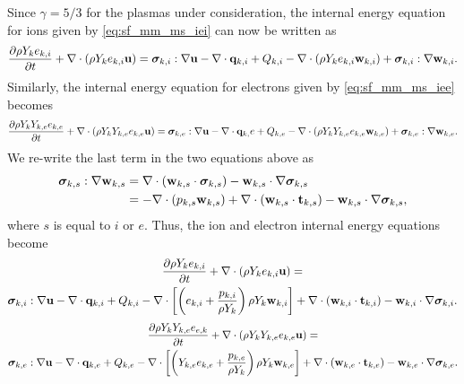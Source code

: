 \documentclass[a4paper,11pt]{report}
\begin{document}
Since $\gamma = 5/3$ for the plasmas under consideration, the internal energy equation for ions given by \cref{eq:sf_mm_ms_iei} can now be written as
\begin{equation*}
    \frac{\partial \rho Y_k e_{k,i}}{\partial t} + \nabla \cdot \left( \rho Y_k e_{k,i} \mathbf{u} \right) = \bm \sigma_{k,i} : \nabla \mathbf{u} - \nabla \cdot \mathbf{q}_{k,i} + Q_{k,i} - \nabla \cdot \left( \rho Y_k e_{k,i} \mathbf{w}_{k,i} \right) + \bm \sigma_{k,i} : \nabla \mathbf{w}_{k,i}.
\end{equation*}
Similarly, the internal energy equation for electrons given by \cref{eq:sf_mm_ms_iee} becomes
\begin{equation*}
    \frac{\partial \rho Y_k Y_{k,e} e_{k,e}}{\partial t} + \nabla \cdot \left( \rho Y_k Y_{k,e} e_{k,e} \mathbf{u} \right) = \bm \sigma_{k,e} : \nabla \mathbf{u} - \nabla \cdot \mathbf{q}_{k,}e + Q_{k,e} - \nabla \cdot \left( \rho Y_k Y_{k,e} e_{k,e} \mathbf{w}_{k,e} \right) + \bm \sigma_{k,e} : \nabla \mathbf{w}_{k,e}.
\end{equation*}
We re-write the last term in the two equations above as
\begin{align*}
    \bm \sigma_{k,s} : \nabla \mathbf{w}_{k,s} &= \nabla \cdot \left( \mathbf{w}_{k,s} \cdot \bm \sigma_{k,s} \right) - \mathbf{w}_{k,s} \cdot \nabla \bm \sigma_{k,s} \\
    &= -\nabla \cdot (p_{k,s} \mathbf{w}_{k,s} ) + \nabla \cdot \left( \mathbf{w}_{k,s} \cdot \mathbf{t}_{k,s} \right) - \mathbf{w}_{k,s} \cdot \nabla \bm \sigma_{k,s},
\end{align*}
where $s$ is equal to $i$ or $e$. Thus, the ion and electron internal energy equations become
\begin{multline*}
    \frac{\partial \rho Y_k e_{k,i}}{\partial t} + \nabla \cdot \left( \rho Y_k e_{k,i} \mathbf{u} \right) = \\
    \bm \sigma_{k,i} : \nabla \mathbf{u} - \nabla \cdot \mathbf{q}_{k,i} + Q_{k,i} - \nabla \cdot \left[ \left( e_{k,i} + \frac{p_{k,i}}{\rho Y_k} \right) \rho Y_k \mathbf{w}_{k,i} \right] + \nabla \cdot \left( \mathbf{w}_{k,i} \cdot \mathbf{t}_{k,i} \right) - \mathbf{w}_{k,i} \cdot \nabla \bm \sigma_{k,i}.
\end{multline*}
\begin{multline*}
    \frac{\partial \rho Y_k Y_{k,e} e_{e,k}}{\partial t} + \nabla \cdot \left( \rho Y_k Y_{k,e} e_{k,e} \mathbf{u} \right) = \\
    \bm \sigma_{k,e} : \nabla \mathbf{u} - \nabla \cdot \mathbf{q}_{k,e} + Q_{k,e} - \nabla \cdot \left[ \left( Y_{k,e} e_{k,e} + \frac{p_{k,e}}{\rho Y_k} \right) \rho Y_k \mathbf{w}_{k,e} \right] + \nabla \cdot \left( \mathbf{w}_{k,e} \cdot \mathbf{t}_{k,e} \right) - \mathbf{w}_{k,e} \cdot \nabla \bm \sigma_{k,e}.
\end{multline*}
\end{document}
